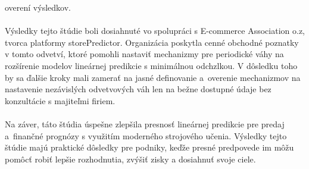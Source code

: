     overení výsledkov.\\
    \\
    Výsledky tejto štúdie boli dosiahnuté vo spolupráci s E-commerce
    Association o.z, tvorca platformy storePredictor. Organizácia poskytla cenné obchodné
    poznatky v tomto odvetví, ktoré pomohli nastaviť mechanizmy
    pre periodické váhy na rozšírenie modelov lineárnej predikcie s minimálnou odchzlkou.
    V dôsledku toho by sa ďalšie kroky mali zamerať na jasné definovanie a~overenie
    mechanizmov na nastavenie nezávislých odvetvových váh len na bežne dostupné údaje
    bez konzultácie s majiteľmi firiem.\\
    \\
    Na záver, táto štúdia úspešne zlepšila presnosť lineárnej predikcie pre predaj a~finančné
    prognózy s využitím moderného strojového učenia. Výsledky tejto štúdie majú praktické
    dôsledky pre podniky, keďže presné predpovede im môžu pomôcť robiť lepšie rozhodnutia,
    zvýšiť zisky a dosiahnuť svoje ciele.
